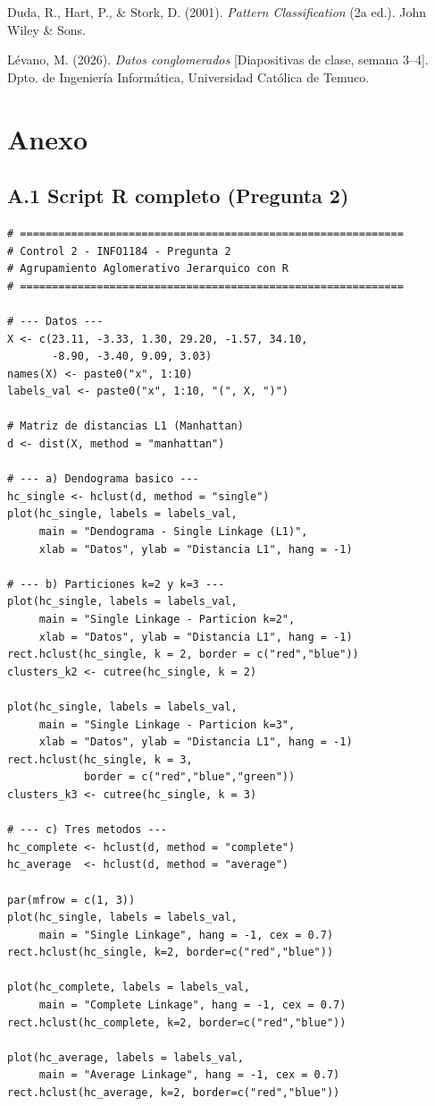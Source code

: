 \documentclass[10pt,a4paper]{article}
\begin{document}
Duda, R., Hart, P., \& Stork, D. (2001). \textit{Pattern Classification} (2a ed.). John Wiley \& Sons.

Lévano, M. (2026). \textit{Datos conglomerados} [Diapositivas de clase, semana 3--4]. Dpto. de Ingeniería Informática, Universidad Católica de Temuco.

\newpage
\section*{Anexo}

\subsection*{A.1 Script R completo (Pregunta 2)}

\begin{lstlisting}
# ============================================================
# Control 2 - INFO1184 - Pregunta 2
# Agrupamiento Aglomerativo Jerarquico con R
# ============================================================

# --- Datos ---
X <- c(23.11, -3.33, 1.30, 29.20, -1.57, 34.10,
       -8.90, -3.40, 9.09, 3.03)
names(X) <- paste0("x", 1:10)
labels_val <- paste0("x", 1:10, "(", X, ")")

# Matriz de distancias L1 (Manhattan)
d <- dist(X, method = "manhattan")

# --- a) Dendograma basico ---
hc_single <- hclust(d, method = "single")
plot(hc_single, labels = labels_val,
     main = "Dendograma - Single Linkage (L1)",
     xlab = "Datos", ylab = "Distancia L1", hang = -1)

# --- b) Particiones k=2 y k=3 ---
plot(hc_single, labels = labels_val,
     main = "Single Linkage - Particion k=2",
     xlab = "Datos", ylab = "Distancia L1", hang = -1)
rect.hclust(hc_single, k = 2, border = c("red","blue"))
clusters_k2 <- cutree(hc_single, k = 2)

plot(hc_single, labels = labels_val,
     main = "Single Linkage - Particion k=3",
     xlab = "Datos", ylab = "Distancia L1", hang = -1)
rect.hclust(hc_single, k = 3,
            border = c("red","blue","green"))
clusters_k3 <- cutree(hc_single, k = 3)

# --- c) Tres metodos ---
hc_complete <- hclust(d, method = "complete")
hc_average  <- hclust(d, method = "average")

par(mfrow = c(1, 3))
plot(hc_single, labels = labels_val,
     main = "Single Linkage", hang = -1, cex = 0.7)
rect.hclust(hc_single, k=2, border=c("red","blue"))

plot(hc_complete, labels = labels_val,
     main = "Complete Linkage", hang = -1, cex = 0.7)
rect.hclust(hc_complete, k=2, border=c("red","blue"))

plot(hc_average, labels = labels_val,
     main = "Average Linkage", hang = -1, cex = 0.7)
rect.hclust(hc_average, k=2, border=c("red","blue"))
\end{lstlisting}
\end{document}
